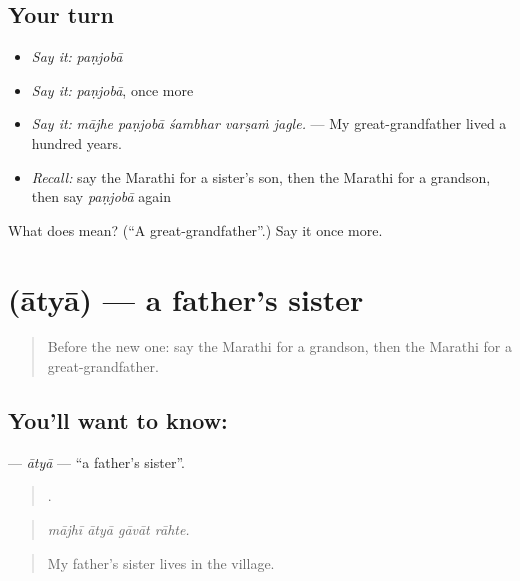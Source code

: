 \subsection*{Your turn}
\begin{itemize}
\raggedright
  \item \emph{Say it:} \emph{paṇjobā}
  \item \emph{Say it:} \emph{paṇjobā}, once more
  \item \emph{Say it:} \emph{mājhe paṇjobā śambhar varṣaṁ jagle.} — My great-grandfather lived a hundred years.
  \item \emph{Recall:} say the Marathi for a sister's son, then the Marathi for a grandson, then say \emph{paṇjobā} again
\end{itemize}

\begin{tcolorbox}[breakable,colback=teal!4,colframe=teal!35!black,title={Before you move on}]
What does  mean? (\textquotedblleft{}A great-grandfather\textquotedblright{}.) Say it once more.
\end{tcolorbox}
\section[\texorpdfstring{\mr{आत्या} (ātyā)}{आत्या (ātyā)}]{ (ātyā) — a father's sister}

\label{lesson:MR-C495-atya}



\begin{quote}
Before the new one: say the Marathi for a grandson, then the Marathi for a great-grandfather.
\end{quote}

\subsection*{You'll want to know: }
\textbf{} — \emph{ātyā} — \textquotedblleft{}a father's sister\textquotedblright{}.

\begin{quote}
   .
\end{quote}

\begin{quote}
\emph{mājhī ātyā gāvāt rāhte.}
\end{quote}

\begin{quote}
My father's sister lives in the village.
\end{quote}

